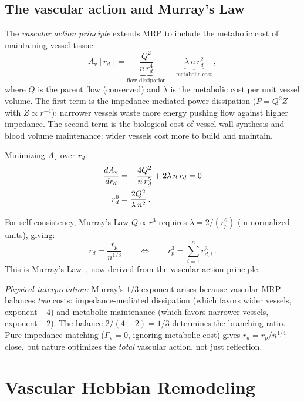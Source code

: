 ﻿\documentclass[aps,pre,twocolumn,superscriptaddress,floatfix]{revtex4-2}
\newcommand{\Gv}{\Gamma_{\mathrm{v}}}
\newcommand{\Av}{A_{\mathrm{v}}}
\begin{document}
\subsection{The vascular action and Murray's Law}
\label{sec:murray}

The \emph{vascular action principle} extends MRP to include
the metabolic cost of maintaining vessel tissue:
\begin{equation}\label{eq:action_v}
  \Av[r_d] = \underbrace{\frac{Q^2}{n\,r_d^4}}_{\text{flow dissipation}}
           + \underbrace{\lambda\,n\,r_d^2}_{\text{metabolic cost}}\,,
\end{equation}
where $Q$ is the parent flow (conserved) and $\lambda$ is
the metabolic cost per unit vessel volume.
The first term is the impedance-mediated power dissipation
($P = Q^2 Z$ with $Z \propto r^{-4}$): narrower vessels
waste more energy pushing flow against higher impedance.
The second term is the biological cost of vessel wall
synthesis and blood volume maintenance: wider vessels cost
more to build and maintain.

Minimizing $\Av$ over $r_d$:
\begin{align}
  \frac{d\Av}{dr_d}
  &= -\frac{4Q^2}{n\,r_d^5} + 2\lambda\,n\,r_d = 0 \notag\\
  r_d^6 &= \frac{2Q^2}{\lambda\,n^2}\,.
  \label{eq:murray_deriv}
\end{align}

For self-consistency, Murray's Law $Q \propto r^3$
requires $\lambda = 2/(r_p^6)$ (in normalized units),
giving:
\begin{equation}\label{eq:murray_result}
  \boxed{r_d = \frac{r_p}{n^{1/3}}}
  \qquad\Leftrightarrow\qquad
  r_p^3 = \sum_{i=1}^{n} r_{d,i}^3\,.
\end{equation}
This is Murray's Law~\cite{murray1926}, now derived
from the vascular action principle.

\emph{Physical interpretation:}
Murray's $1/3$ exponent arises because vascular MRP
balances \emph{two} costs: impedance-mediated dissipation
(which favors wider vessels, exponent $-4$) and metabolic
maintenance (which favors narrower vessels, exponent $+2$).
The balance $2/(4+2) = 1/3$ determines the
branching ratio.
Pure impedance matching ($\Gv = 0$, ignoring metabolic cost)
gives $r_d = r_p / n^{1/4}$---close, but nature optimizes
the \emph{total} vascular action, not just reflection.


\section{Vascular Hebbian Remodeling}\label{sec:hebbian}
\end{document}
